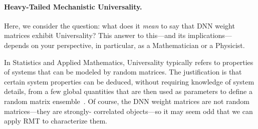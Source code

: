 

\paragraph{Heavy-Tailed Mechanistic Universality.} 


Here, we consider the question:
what does it \emph{mean} to say that DNN weight matrices exhibit Universality? 
This answer to this---and its implications---depends on your perspective, in particular, as a Mathematician or a Physicist.

In Statistics and Applied Mathematics, Universality typically refers to properties of systems that can be modeled by random matrices.
The justification is that certain system properties can be deduced, without requiring knowledge of system details, from a few global quantities that are then used as parameters to define a random matrix ensemble~\cite{ER05,EW13}.
Of course, the DNN weight matrices are not random matrices---they are strongly- correlated objects---so it may seem odd that we can apply RMT to characterize them.

